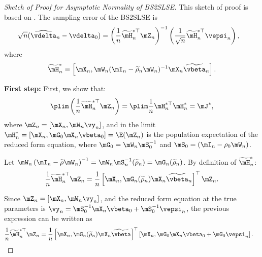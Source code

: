 \documentclass[english,12pt]{book}\usepackage[]{graphicx}\usepackage[]{xcolor}
\begin{document}
\begin{proof}[Sketch of Proof for Asymptotic Normality of BS2SLSE]
This sketch of proof is based on \cite{lee2003best}. The sampling error of the BS2SLSE is
\begin{equation}\label{eq:asy_2sls_pr2}
\begin{aligned}
\sqrt{n}(\widehat{\vdelta}_{n} - \vdelta_0) & = \left(\frac{1}{n}\widetilde{\mH}^{*\top}_n \mZ_n\right)^{-1}\left(\frac{1}{\sqrt{n}}\widetilde{\mH}^{*\top}_n\vepsi_n\right),
\end{aligned}
\end{equation}
%
where 
\begin{equation*}
\widetilde{\mH}^{*}_n =\left[\mX_n, \mW_n(\mI_n - \widetilde{\rho}_n\mW_n)^{-1}\mX_n\widetilde{\vbeta}_n\right].
\end{equation*}

\textbf{First step:} First, we show that:
\begin{equation*}
\plim \left(\frac{1}{n}\widetilde{\mH}^{*\top}_n \mZ_n\right)=\plim \frac{1}{n}\mH^{*\top}_n\mH_n^* = \mJ^*, 
\end{equation*}
%
where $\mZ_n = \left[\mX_n, \mW_n\vy_n\right]$, and in the limit $\mH^{*}_n = \left[\mX_n, \mG_0 \mX_n\vbeta_0\right] = \E(\mZ_n)$ is the population expectation of the reduced form equation, where $\mG_0 = \mW_n\mS_0^{-1}$ and $\mS_0 = \left(\mI_n - \rho_0\mW_n\right)$.

Let $\mW_n\left(\mI_n - \widetilde{\rho}\mW_n\right)^{-1} = \mW_n\mS_n^{-1}(\widetilde{\rho}_n) = \mG_n(\widetilde{\rho}_n)$. By definition of $\widetilde{\mH}^{*}_n$:
\begin{equation*}
  \frac{1}{n}\widetilde{\mH}^{*\top}_n \mZ_n = \frac{1}{n}\left[\mX_n, \mG_n(\widetilde{\rho}_n)\mX_n\widetilde{\vbeta}_n\right]^\top\mZ_n. 
\end{equation*}

Since $\mZ_n = \left[\mX_n, \mW_n\vy_n\right]$, and the reduced form equation at the true parameters is $\vy_n = \mS_0^{-1}\mX_n\vbeta_0 + \mS_0^{-1}\vepsi_n$, the previous expression can be written as
\begin{equation*}
\begin{aligned}
\frac{1}{n}\widetilde{\mH}^{*\top}_n \mZ_n & = \frac{1}{n}\left[\mX_n, \mG_n(\widetilde{\rho}_n)\mX_n\widetilde{\vbeta}\right]^\top\left[\mX_n, \mG_0\mX_n\vbeta_0 + \mG_0\vepsi_n\right].
\end{aligned}
\end{equation*}


\end{proof}
\end{document}
